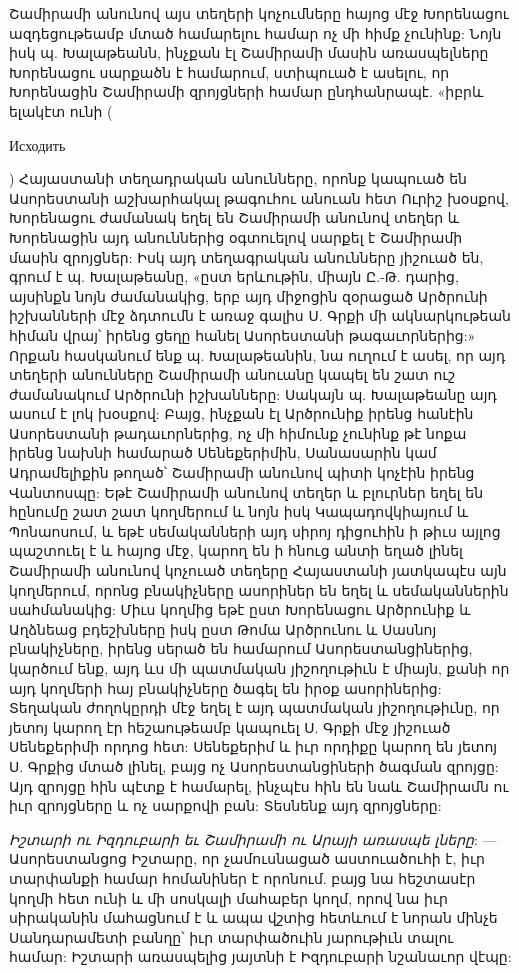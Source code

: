 \documentclass{article}
\begin{document}
{Շամիրամի անունով այս տեղերի կոչումները հայոց մէջ Խորենացու ազդեցութեամբ մտած համարելու համար ոչ մի հիմք չունինք: Նոյն իսկ պ. Խալաթեանն, ինչքան էլ Շամիրամի մասին առասպելները Խորենացու սարքածն է համարում, ստիպուած է ասելու, որ Խորենացին Շամիրամի զրոյցների համար ընդհանրապէ. «իբրև ելակէտ ունի (\begin{russian}Исходить\end{russian}) Հայաստանի տեղադրական անունները, որոնք կապուած են Ասորեստանի աշխարհակալ թագուհու անուան հետ Ուրիշ խօսքով, Խորենացու ժամանակ եղել են Շամիրամի անունով տեղեր և Խորենացին այդ անուններից օգտուելով սարքել է Շամիրամի մասին զրոյցներ: Իսկ այդ տեղագրական անունները յիշուած են, գրում է պ. Խալաթեանը, «ըստ երևութին, միայն Ը.-Թ. դարից, այսինքն նոյն ժամանակից, երբ այդ միջոցին զօրացած Արծրունի իշխանների մէջ ձդտումն է առաջ գալիս Ս. Գրքի մի ակնարկութեան հիման վրայ՝ իրենց ցեղը հանել Ասորեստանի թագաւորներից:» Որքան հասկանում ենք պ. Խալաթեանին, նա ուղում է ասել, որ այդ տեղերի անունները Շամիրամի անուանը կապել են շատ ուշ ժամանակում Արծրունի իշխանները: Սակայն պ. Խալաթեանը այդ ասում է լոկ խօսքով: Բայց, ինչքան էլ Արծրունիք իրենց հանէին Ասորեստանի թադաւորներից, ոչ մի հիմունք չունինք թէ նոքա իրենց նախնի համարած Սենեքերիմին, Սանասարին կամ Ադրամելիքին թողած՝ Շամիրամի անունով պիտի կոչէին իրենց Վանտոսպը: Եթէ Շամիրամի անունով տեղեր և բլուրներ եղել են հընումը շատ շատ կողմերում և նոյն իսկ Կապադովկիայում և Պոնաոսում, և եթէ սեմականների այդ սիրոյ դիցուհին ի թիւս այլոց պաշտուել է և հայոց մէջ, կարող են ի հնուց անտի եղած լինել Շամիրամի անունով կոչուած տեղերը Հայաստանի յատկապէս այն կողմերում, որոնց բնակիչները ասորիներ են եղել և սեմականներին սահմանակից: Միւս կողմից եթէ ըստ Խորենացու Արծրունիք և Աղձնեաց բդեշխները իսկ ըստ Թոմա Արծրունու և Սասնոյ բնակիչները, իրենց սերած են համարում Ասորեստանցիներից, կարծում ենք, այդ ևս մի պատմական յիշողութիւն է միայն, քանի որ այդ կողմերի հայ բնակիչները ծագել են իրօք ասորիներից: Տեղական ժողոկըրդի մէջ եղել է այդ պատմական յիշողութիւնը, որ յետոյ կարող էր հեշաութեամբ կապուել Ս. Գրքի մէջ յիշուած Սենեքերիմի որդոց հետ: Սենեքերիմ և իւր որդիքը կարող են յետոյ Ս. Գրքից մտած լինել, բայց ոչ Ասորեստանցիների ծագման զրոյցը: Այդ զրոյցը հին պէտք է համարել, ինչպէս հին են նաև Շամիրամն ու իւր զրոյցները և ոչ սարքովի բան: Տեսնենք այդ զրոյցները:

\emph{Իշտարի ու Իզդուբարի եւ Շամիրամի ու Արայի առասպե լները}: — Ասորեստանցոց Իշտարը, որ չամուսնացած աստուածուհի է, իւր տարփանքի համար հոմանիներ է որոնում. բայց նա հեշտասէր կողմի հետ ունի և մի սոսկալի մահաբեր կողմ, որով նա իւր սիրականին մահացնում է և ապա վշտից հետևում է նորան մինչե Սանդարամետի բանղը՝ իւր տարփածուին յարութիւն տալու համար: Իշտարի առասպելից յայտնի է Իզդուբարի նշանաւոր վէպը:

}
\end{document}
